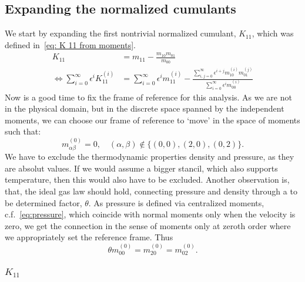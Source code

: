 \subsection{Expanding the normalized cumulants}
\label{sub:Expanding the normalized cumulants}
We start by expanding the first nontrivial normalized cumulant, $K_{11}$, which was defined in~\eqref{eq: K 11 from moments}.
\begin{equation}
  \begin{aligned}
    K_{11} & = m_{11} - \frac{m_{10}m_{01}}{m_{00}}\\
    \Leftrightarrow
    \sum_{i=0}^\infty \epsilon^i K_{11}^{(i)}
    & = \sum_{i=0}^\infty \epsilon^i m_{11}^{(i)} -
    \frac{\sum_{i,j=0}^\infty \epsilon^{i+j} m_{10}^{(i)}m_{01}^{(j)}}
         {\sum_{i=0}^\infty \epsilon^i m_{00}^{(i)}}
  \end{aligned}
\end{equation}
Now is a good time to fix the frame of reference for this analysis. As we are
not in the physical domain, but in the discrete space spanned by the independent
moments, we can choose our frame of reference to `move' in the space of moments such that:
\begin{equation}
  \label{eq: frame of reference}
  m_{\alpha\beta}^{(0)} = 0, \quad (\alpha,\beta)\nin \{(0,0),(2,0),(0,2)\}.
\end{equation}
We have to exclude the thermodynamic properties density and pressure, as they are absolut values. If we would assume a bigger stancil, which also supports temperature, then this would also have to be excluded.
Another observation is, that, the ideal gas law should hold, connecting pressure and density through a to be determined factor, $\theta$. As pressure is defined via centralized moments, c.f.~\eqref{eq:pressure}, which coincide with normal moments only when the velocity is zero, we get the connection in the sense of moments only at zeroth order where we appropriately set the reference frame. Thus
\begin{equation}
  \label{eq: ideal gas}
  \theta m_{00}^{(0)} = m_{20}^{(0)} = m_{02}^{(0)}.
\end{equation}

\subsubsection{\texorpdfstring{$K_{11}$}{K 11}}
\label{subs:K 11}

